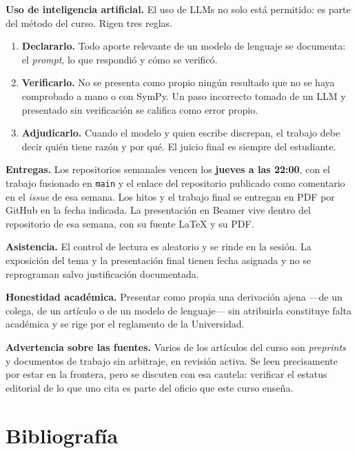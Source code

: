 \documentclass[11pt]{article}
\begin{document}
\textbf{Uso de inteligencia artificial.} El uso de LLMs no solo est\'a permitido: es parte del m\'etodo del curso. Rigen tres reglas.

\begin{enumerate}
\item \textbf{Declararlo.} Todo aporte relevante de un modelo de lenguaje se documenta: el \emph{prompt}, lo que respondi\'o y c\'omo se verific\'o.
\item \textbf{Verificarlo.} No se presenta como propio ning\'un resultado que no se haya comprobado a mano o con SymPy. Un paso incorrecto tomado de un LLM y presentado sin verificaci\'on se califica como error propio.
\item \textbf{Adjudicarlo.} Cuando el modelo y quien escribe discrepan, el trabajo debe decir qui\'en tiene raz\'on y por qu\'e. El juicio final es siempre del estudiante.
\end{enumerate}

\textbf{Entregas.} Los repositorios semanales vencen los \textbf{jueves a las 22:00}, con el trabajo fusionado en \texttt{main} y el enlace del repositorio publicado como comentario en el \emph{issue} de esa semana. Los hitos y el trabajo final se entregan en PDF por GitHub en la fecha indicada. La presentaci\'on en Beamer vive dentro del repositorio de esa semana, con su fuente \LaTeX{} y su PDF.

\textbf{Asistencia.} El control de lectura es aleatorio y se rinde en la sesi\'on. La exposici\'on del tema y la presentaci\'on final tienen fecha asignada y no se reprograman salvo justificaci\'on documentada.

\textbf{Honestidad acad\'emica.} Presentar como propia una derivaci\'on ajena ---de un colega, de un art\'iculo o de un modelo de lenguaje--- sin atribuirla constituye falta acad\'emica y se rige por el reglamento de la Universidad.

\textbf{Advertencia sobre las fuentes.} Varios de los art\'iculos del curso son \emph{preprints} y documentos de trabajo sin arbitraje, en revisi\'on activa. Se leen precisamente por estar en la frontera, pero se discuten con esa cautela: verificar el estatus editorial de lo que uno cita es parte del oficio que este curso ense\~na.

\section{Bibliograf\'ia}
\end{document}
